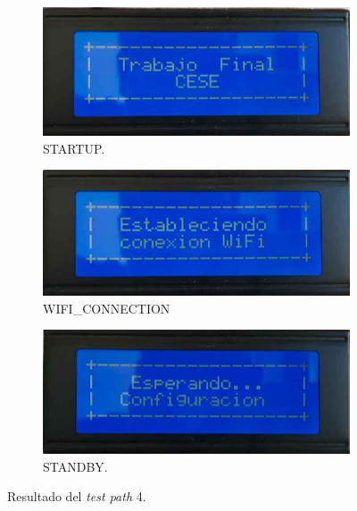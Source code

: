 \begin{figure}[!htpb]
     \centering
     \begin{subfigure}[b]{0.4\textwidth}
         \centering
         \includegraphics[width=1.1\textwidth]{./Figures/Bienvenida.jpeg}
         \caption{STARTUP.}
         \label{fig:pruIni_4_1}
     \end{subfigure}
           \hfill
     \begin{subfigure}[b]{0.4\textwidth}
         \centering
         \includegraphics[width=1.1\textwidth]{./Figures/Esta_conex_WiFi.jpeg}
         \caption{WIFI\_CONNECTION}
         \label{fig:pruIni_4_2}
     \end{subfigure}
           \hfill
     \begin{subfigure}[b]{0.4\textwidth}
         \centering
         \includegraphics[width=1.1\textwidth]{./Figures/Esp_Conf.jpeg}
         \caption{STANDBY.}
         \label{fig:pruIni_4_3}
     \end{subfigure}
        \caption{Resultado del \textit{test path} 4.}
        \label{fig:pruIni_4_res}
\end{figure}

